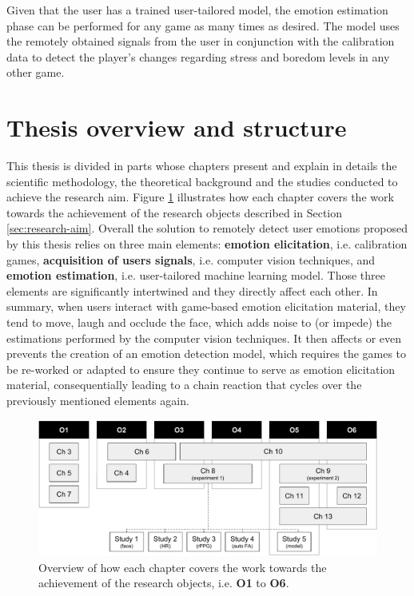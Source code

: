 Given that the user has a trained user-tailored model, the emotion estimation phase can be performed for any game as many times as desired. The model uses the remotely obtained signals from the user in conjunction with the calibration data to detect the player's changes regarding stress and boredom levels in any other game.


\section{Thesis overview and structure}

This thesis is divided in parts whose chapters present and explain in details the scientific methodology, the theoretical background and the studies conducted to achieve the research aim. Figure \ref{fig:research-chapters-overview} illustrates how each chapter covers the work towards the achievement of the research objects described in Section \ref{sec:research-aim}. Overall the solution to remotely detect user emotions proposed by this thesis relies on three main elements: \textbf{emotion elicitation}, i.e. calibration games, \textbf{acquisition of users signals}, i.e. computer vision techniques, and \textbf{emotion estimation}, i.e. user-tailored machine learning model. Those three elements are significantly intertwined and they directly affect each other. In summary, when users interact with game-based emotion elicitation material, they tend to move, laugh and occlude the face, which adds noise to (or impede) the estimations performed by the computer vision techniques. It then affects or even prevents the creation of an emotion detection model, which requires the games to be re-worked or adapted to ensure they continue to serve as emotion elicitation material, consequentially leading to a chain reaction that cycles over the previously mentioned elements again.

\begin{figure}[h]
    \centering
    \includegraphics[width=\textwidth]{Content/figures/research-chapters-overview}
    \caption{Overview of how each chapter covers the work towards the achievement of the research objects, i.e. \textbf{O1} to \textbf{O6}.}
    \label{fig:research-chapters-overview}
\end{figure}

